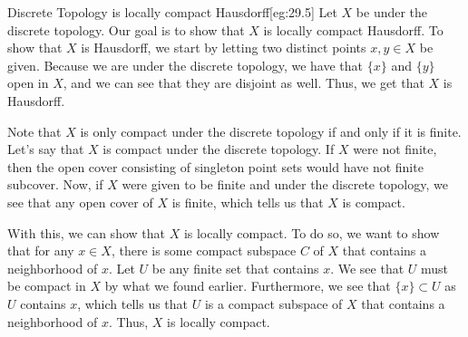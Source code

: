 \begin{egBox}{Discrete Topology is locally compact Hausdorff}[eg:29.5]
    Let \( X \) be under the discrete topology.
    Our goal is to show that \( X \) is locally compact Hausdorff.
    To show that \( X \) is Hausdorff, we start by letting two distinct points 
    \( x, y \in X \) be given. 
    Because we are under the discrete topology, we have that \( \{ x \} \) and 
    \( \{ y \} \) open in \( X \), and we can see that they are disjoint as well. 
    Thus, we get that \( X \) is Hausdorff.

    \baseSkip

    Note that \( X \) is only compact under the discrete topology if and only if it is 
    finite.
    Let's say that \( X \) is compact under the discrete topology.
    If \( X \) were not finite, then the open cover consisting of singleton 
    point sets would have not finite subcover.
    Now, if \( X \) were given to be finite and under the discrete topology, we see 
    that any open cover of \( X \) is finite, which tells us that \( X \) is compact.

    \baseSkip

    With this, we can show that \( X \) is locally compact. 
    To do so, we want to show that for any \( x \in X \), there is some compact 
    subspace \( C \) of \( X \) that contains a neighborhood of \( x \).
    Let \( U \) be any finite set that contains \( x \). 
    We see that \( U \) must be compact in \( X \) by what we found earlier. 
    Furthermore, we see that \( \{ x \} \subset U \) as \( U \) contains \( x \), 
    which tells us that \( U \) is a compact subspace of \( X \) that contains a 
    neighborhood of \( x \).
    Thus, \( X \) is locally compact. 
\end{egBox}